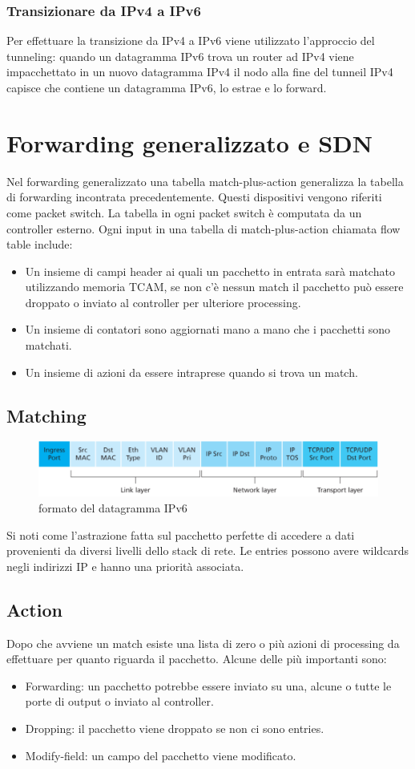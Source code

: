 \subsubsection{Transizionare da IPv4 a IPv6}
Per effettuare la transizione da IPv4 a IPv6 viene utilizzato l'approccio del tunneling: quando un datagramma IPv6 trova un router ad IPv4 viene 
impacchettato in un nuovo datagramma IPv4 il nodo alla fine del tunneil IPv4 capisce che contiene un datagramma IPv6, lo estrae e lo forward. 
\section{Forwarding generalizzato e SDN}
Nel forwarding generalizzato una tabella match-plus-action generalizza la tabella di forwarding incontrata precedentemente. Questi dispositivi vengono 
riferiti come packet switch. La tabella in ogni packet switch \`e computata da un controller esterno. Ogni input in una tabella di match-plus-action 
chiamata flow table include:
\begin{itemize}
\item Un insieme di campi header ai quali un pacchetto in entrata sar\`a matchato utilizzando memoria TCAM, se non c'\`e nessun match il pacchetto pu\`o 
essere droppato o inviato al controller per ulteriore processing. 
\item Un insieme di contatori sono aggiornati mano a mano che i pacchetti sono matchati.
\item Un insieme di azioni da essere intraprese quando si trova un match. 
\end{itemize}
\subsection{Matching}
\begin{figure}[h]
\includegraphics[width=\textwidth]{FlowTableEntry.png}
\caption{formato del datagramma IPv6}
\end{figure}
Si noti come l'astrazione fatta sul pacchetto perfette di accedere a dati provenienti da diversi livelli dello stack di rete. Le entries possono avere 
wildcards negli indirizzi IP e hanno una priorit\`a associata. 
\subsection{Action}
Dopo che avviene un match esiste una lista di zero o pi\`u azioni di processing da effettuare per quanto riguarda il pacchetto. Alcune delle pi\`u 
importanti sono:
\begin{itemize}
\item Forwarding: un pacchetto potrebbe essere inviato su una, alcune o tutte le porte di output o inviato al controller.
\item Dropping: il pacchetto viene droppato se non ci sono entries.
\item Modify-field: un campo del pacchetto viene modificato.
\end{itemize}
